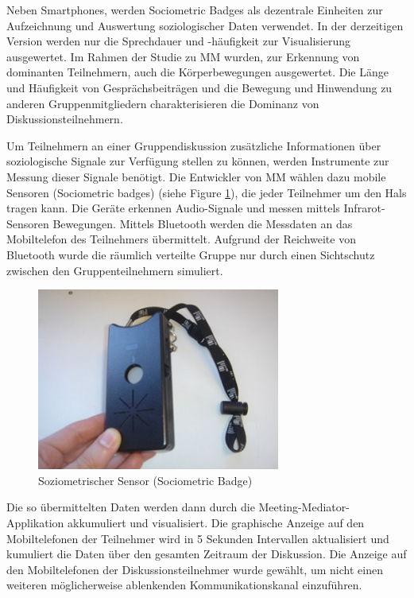 Neben Smartphones, werden Sociometric Badges \cite{MITbadge} als dezentrale
Einheiten zur Aufzeichnung und Auswertung soziologischer Daten verwendet. In der
derzeitigen Version werden nur die Sprechdauer und -häufigkeit zur
Visualisierung ausgewertet. Im Rahmen der Studie zu MM wurden, zur Erkennung von
dominanten Teilnehmern, auch die Körperbewegungen ausgewertet. Die Länge und
Häufigkeit von Ge\-sprächs\-bei\-trä\-gen und die Bewegung und Hinwendung zu
anderen Gruppenmitgliedern charakterisieren die Dominanz von
Diskussionsteilnehmern.

Um Teilnehmern an einer Gruppendiskussion zusätzliche Informationen über
soziologische Signale zur Verfügung stellen zu können, werden Instrumente zur
Messung dieser Signale benötigt. Die Entwickler von MM wählen dazu mobile
Sensoren (Sociometric badges) (siehe Figure \ref{badge}), die jeder Teilnehmer
um den Hals tragen kann.
Die Geräte erkennen Audio-Signale und messen mittels Infrarot-Sen\-so\-ren
Bewegungen. Mittels Bluetooth werden die Messdaten an das Mobiltelefon des
Teilnehmers übermittelt. Aufgrund der Reichweite von Bluetooth wurde die
räumlich verteilte Gruppe nur durch einen Sichtschutz zwischen den
Gruppenteilnehmern simuliert.

\begin{figure}[htp]
\centering
\includegraphics[width=8cm]{sociometricbadge.jpg}
\caption{Soziometrischer Sensor (Sociometric Badge) \protect\cite{MITbadge}}
\label{badge}
\end{figure}

Die so übermittelten Daten werden dann durch die Meeting-Mediator-Applikation
akkumuliert und visualisiert.
Die graphische Anzeige auf den Mobiltelefonen der Teilnehmer wird in 5 Sekunden
Intervallen aktualisiert und kumuliert die Daten über den gesamten Zeitraum der
Diskussion.
Die Anzeige auf den Mobiltelefonen der Diskussionsteilnehmer wurde gewählt, um
nicht einen weiteren mög\-li\-cher\-wei\-se ablenkenden Kommunikationskanal
einzuführen.

